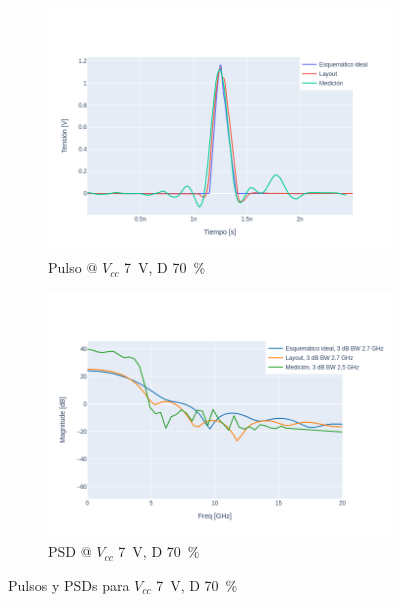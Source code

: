 \begin{figure}[t!]
    \centering
    \begin{subfigure}[b]{0.49\textwidth}
        \centering
        \includegraphics[width=\textwidth]{images/plots/Vcc_7V_duty_70_time_domain.png}
        \caption{Pulso @ $V_{cc}$ \qty{7}{\volt}, D \qty{70}{\percent} }
        \label{fig:pulses_7v_70}
    \end{subfigure}
    \hfill
    \begin{subfigure}[b]{0.49\textwidth}
        \centering
        \includegraphics[width=\textwidth]{images/plots/Vcc_7V_duty_70_psd.png}
        \caption{PSD @ $V_{cc}$ \qty{7}{\volt}, D \qty{70}{\percent} }
        \label{fig:psd_7v_70}
    \end{subfigure}
    \caption{Pulsos y PSDs para $V_{cc}$ \qty{7}{\volt}, D \qty{70}{\percent} }
    \label{fig:plots_7v_70}
\end{figure}

